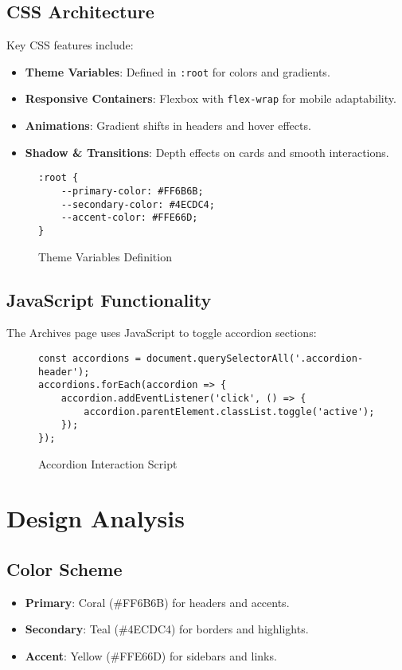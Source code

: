 \documentclass[a4paper,12pt]{article}
\begin{document}
\subsection{CSS Architecture}
Key CSS features include:
\begin{itemize}
    \item \textbf{Theme Variables}: Defined in \texttt{:root} for colors and gradients.
    \item \textbf{Responsive Containers}: Flexbox with \texttt{flex-wrap} for mobile adaptability.
    \item \textbf{Animations}: Gradient shifts in headers and hover effects.
    \item \textbf{Shadow \& Transitions}: Depth effects on cards and smooth interactions.
\end{itemize}

\begin{figure}[H]
\begin{verbatim}
:root {
    --primary-color: #FF6B6B;
    --secondary-color: #4ECDC4;
    --accent-color: #FFE66D;
}
\end{verbatim}
\caption{Theme Variables Definition}
\end{figure}
\subsection{JavaScript Functionality}
The Archives page uses JavaScript to toggle accordion sections:
\begin{figure}[H]
\begin{verbatim}
const accordions = document.querySelectorAll('.accordion-header');
accordions.forEach(accordion => {
    accordion.addEventListener('click', () => {
        accordion.parentElement.classList.toggle('active');
    });
});
\end{verbatim}
\caption{Accordion Interaction Script}
\end{figure}

\section{Design Analysis}
\subsection{Color Scheme}
\begin{itemize}
    \item \textbf{Primary}: Coral (\#FF6B6B) for headers and accents.
    \item \textbf{Secondary}: Teal (\#4ECDC4) for borders and highlights.
    \item \textbf{Accent}: Yellow (\#FFE66D) for sidebars and links.
\end{itemize}
\end{document}
